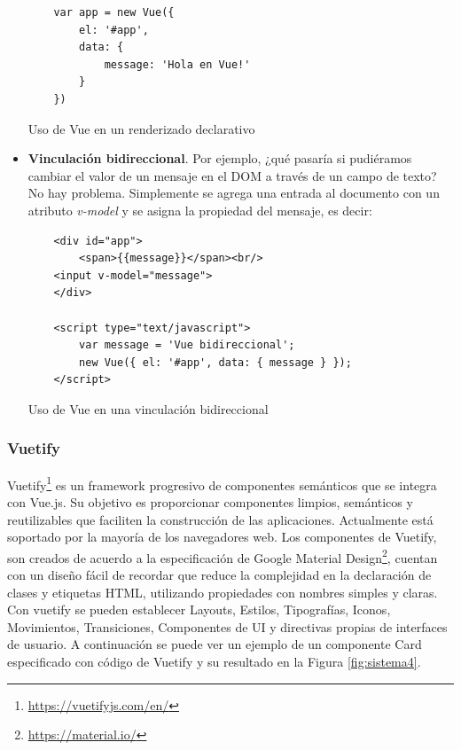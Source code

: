 \begin{itemize}
\begin{verbatim}
    var app = new Vue({
        el: '#app',
        data: {
            message: 'Hola en Vue!'
        }
    })
    \end{verbatim}
    \begin{center}
    \caption{Uso de Vue en un renderizado declarativo}
    \end{center}
    
    \item \textbf{Vinculación bidireccional}. 
    \citep{Gore2016} Por ejemplo, ¿qué pasaría si pudiéramos cambiar el valor de un mensaje en el DOM a través de un campo de texto? No hay problema. Simplemente se agrega una entrada al documento con un atributo \textit{v-model} y se asigna la propiedad del mensaje, es decir:
    \begin{verbatim}
    <div id="app">
        <span>{{message}}</span><br/>
    <input v-model="message">
    </div>
    
    <script type="text/javascript">
        var message = 'Vue bidireccional';
        new Vue({ el: '#app', data: { message } });
    </script>
    \end{verbatim}
    \begin{center}
    \caption{Uso de Vue en una vinculación bidireccional}
    \end{center}
\end{itemize}
\subsubsection{Vuetify}
Vuetify\footnote{\url{https://vuetifyjs.com/en/}} es un framework progresivo de componentes semánticos que se integra con Vue.js. Su objetivo es proporcionar componentes limpios, semánticos y reutilizables que faciliten la construcción de las aplicaciones. Actualmente está soportado por la mayoría de los navegadores web.
Los componentes de Vuetify, son creados de acuerdo a la especificación de Google Material Design\footnote{\url{https://material.io/}}, cuentan con un diseño fácil de recordar que reduce la complejidad en la declaración de clases y etiquetas HTML, utilizando propiedades con nombres simples y claras. Con vuetify se pueden establecer Layouts, Estilos, Tipografías, Iconos, Movimientos, Transiciones, Componentes de UI y directivas propias de interfaces de usuario. A continuación se puede ver un ejemplo de un componente Card especificado con código de Vuetify y su resultado en la Figura \ref{fig:sistema4}.


